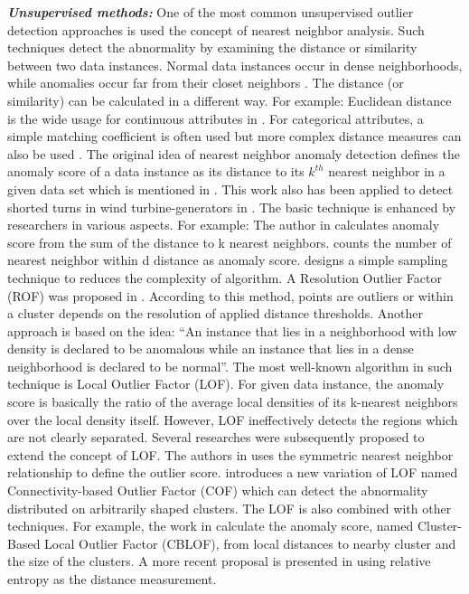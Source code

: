 \textbf{\textit{Unsupervised methods: }} One of the most common unsupervised outlier detection approaches is used the concept of nearest neighbor analysis. Such techniques detect the abnormality by examining the distance or similarity between two data instances. Normal data instances occur in dense neighborhoods, while anomalies occur far from their closet neighbors \cite{chandola2009anomaly}. The distance (or similarity) can be calculated in a different way. For example: Euclidean distance is the wide usage for continuous attributes in \cite{Breunig:2000:LID:335191.335388}\cite{tang2001robust}\cite{kriegel2009loop}. For categorical attributes, a simple matching coefficient is often used but more complex distance measures can also be used \cite{boriah2008similarity}\cite{chandola2008understanding}. The original idea of nearest neighbor anomaly detection defines the anomaly score of a data instance as its distance to its $ k^{th} $ nearest neighbor in a given data set which is mentioned in \cite{byers1998nearest}. This work also has been applied to detect shorted turns in wind turbine-generators in \cite{guttormsson1999elliptical}. The basic technique is enhanced by researchers in various aspects. For example: The author in \cite{eskin2002geometric}\cite{angiulli2002fast}\cite{zhang2006detecting} calculates anomaly score from the sum of the distance to k nearest neighbors. \cite{knorr1997unified} counts the number of nearest neighbor within d distance as anomaly score. \cite{wu2006outlier} designs a simple sampling technique to reduces the complexity of algorithm. A Resolution Outlier Factor (ROF) was proposed in \cite{fan2006nonparametric}. According to this method, points are outliers or within a cluster depends on the resolution of applied distance thresholds. Another approach is based on the idea: “An instance that lies in a neighborhood with low density is declared to be anomalous while an instance that lies in a dense neighborhood is declared to be normal”. The most well-known algorithm in such technique is Local Outlier Factor (LOF)\cite{Breunig:2000:LID:335191.335388}. For given data instance, the anomaly score is basically the ratio of the average local densities of its k-nearest neighbors over the local density itself.  However, LOF ineffectively detects the regions which are not clearly separated. Several researches were subsequently proposed to extend the concept of LOF. The authors in \cite{jin2006ranking} uses the symmetric nearest neighbor relationship to define the outlier score. \cite{tang2002enhancing} introduces a new variation of LOF named Connectivity-based Outlier Factor (COF)\cite{tang2001robust} which can detect the abnormality distributed on arbitrarily shaped clusters. The LOF is also combined with other techniques. For example, the work in \cite{he2002outlier}\cite{he2003discovering} calculate the anomaly score, named Cluster-Based Local Outlier Factor (CBLOF), from local distances to nearby cluster and the size of the clusters. A more recent proposal is presented in \cite{wang2011statistical} using relative entropy as the distance measurement. \\

